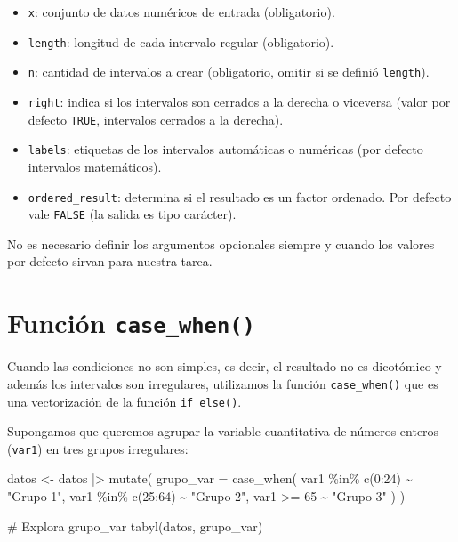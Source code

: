 \documentclass[
  spanish,
  a4paper,
]{scrbook}
\newenvironment{Shaded}{\begin{snugshade}}{\end{snugshade}}
\newcommand{\AttributeTok}[1]{\textcolor[rgb]{0.40,0.45,0.13}{#1}}
\newcommand{\CommentTok}[1]{\textcolor[rgb]{0.37,0.37,0.37}{#1}}
\newcommand{\DecValTok}[1]{\textcolor[rgb]{0.68,0.00,0.00}{#1}}
\newcommand{\FunctionTok}[1]{\textcolor[rgb]{0.28,0.35,0.67}{#1}}
\newcommand{\NormalTok}[1]{\textcolor[rgb]{0.00,0.23,0.31}{#1}}
\newcommand{\OtherTok}[1]{\textcolor[rgb]{0.00,0.23,0.31}{#1}}
\newcommand{\SpecialCharTok}[1]{\textcolor[rgb]{0.37,0.37,0.37}{#1}}
\newcommand{\StringTok}[1]{\textcolor[rgb]{0.13,0.47,0.30}{#1}}
\begin{document}
\begin{itemize}
\item
  \texttt{x}: conjunto de datos numéricos de entrada (obligatorio).
\item
  \texttt{length}: longitud de cada intervalo regular (obligatorio).
\item
  \texttt{n}: cantidad de intervalos a crear (obligatorio, omitir si se
  definió \texttt{length}).
\item
  \texttt{right}: indica si los intervalos son cerrados a la derecha o
  viceversa (valor por defecto \texttt{TRUE}, intervalos cerrados a la
  derecha).
\item
  \texttt{labels}: etiquetas de los intervalos automáticas o numéricas
  (por defecto intervalos matemáticos).
\item
  \texttt{ordered\_result}: determina si el resultado es un factor
  ordenado. Por defecto vale \texttt{FALSE} (la salida es tipo
  carácter).
\end{itemize}

No es necesario definir los argumentos opcionales siempre y cuando los
valores por defecto sirvan para nuestra tarea.

\section{\texorpdfstring{Función
\texttt{case\_when()}}{Función case\_when()}}\label{funciuxf3n-case_when}

Cuando las condiciones no son simples, es decir, el resultado no es
dicotómico y además los intervalos son irregulares, utilizamos la
función \texttt{case\_when()} que es una vectorización de la función
\texttt{if\_else()}.

Supongamos que queremos agrupar la variable cuantitativa de números
enteros (\texttt{var1}) en tres grupos irregulares:

\begin{Shaded}
\begin{Highlighting}[]
\NormalTok{datos }\OtherTok{\textless{}{-}}\NormalTok{ datos }\SpecialCharTok{|\textgreater{}}
  \FunctionTok{mutate}\NormalTok{(}
    \AttributeTok{grupo\_var =} \FunctionTok{case\_when}\NormalTok{(}
\NormalTok{      var1 }\SpecialCharTok{\%in\%} \FunctionTok{c}\NormalTok{(}\DecValTok{0}\SpecialCharTok{:}\DecValTok{24}\NormalTok{) }\SpecialCharTok{\textasciitilde{}} \StringTok{"Grupo 1"}\NormalTok{,}
\NormalTok{      var1 }\SpecialCharTok{\%in\%} \FunctionTok{c}\NormalTok{(}\DecValTok{25}\SpecialCharTok{:}\DecValTok{64}\NormalTok{) }\SpecialCharTok{\textasciitilde{}} \StringTok{"Grupo 2"}\NormalTok{,}
\NormalTok{      var1 }\SpecialCharTok{\textgreater{}=} \DecValTok{65} \SpecialCharTok{\textasciitilde{}} \StringTok{"Grupo 3"}
\NormalTok{    )}
\NormalTok{  )}

\CommentTok{\# Explora grupo\_var}
\FunctionTok{tabyl}\NormalTok{(datos, grupo\_var)}
\end{Highlighting}
\end{Shaded}
\end{document}
